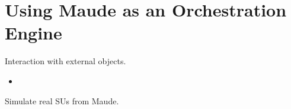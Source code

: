 \section{Using Maude as an Orchestration Engine}

Interaction with external objects.

\begin{itemize}
    \item 
\end{itemize}


Simulate real SUs from Maude.